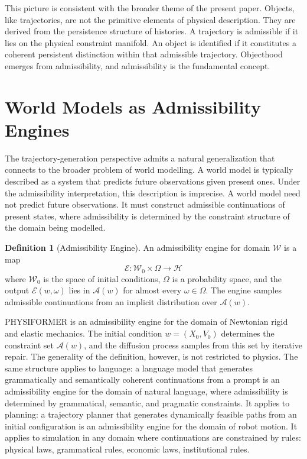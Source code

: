 \documentclass[12pt,oneside]{article}
\theoremstyle{definition}
\newtheorem{definition}[theorem]{Definition}
\newcommand{\A}{\mathcal{A}}
\newcommand{\H}{\mathcal{H}}
\newcommand{\W}{\mathcal{W}}
\begin{document}
This picture is consistent with the broader theme of the present paper. Objects,
like trajectories, are not the primitive elements of physical description. They
are derived from the persistence structure of histories. A trajectory is admissible
if it lies on the physical constraint manifold. An object is identified if it
constitutes a coherent persistent distinction within that admissible trajectory.
Objecthood emerges from admissibility, and admissibility is the fundamental
concept.

\section{World Models as Admissibility Engines}

The trajectory-generation perspective admits a natural generalization that
connects to the broader problem of world modelling. A world model is typically
described as a system that predicts future observations given present ones.
Under the admissibility interpretation, this description is imprecise. A world
model need not predict future observations. It must construct admissible
continuations of present states, where admissibility is determined by the
constraint structure of the domain being modelled.

\begin{definition}[Admissibility Engine]
An admissibility engine for domain \(\W\) is a map
\[
\mathcal{E} : \W_0 \times \Omega \to \H
\]
where \(\W_0\) is the space of initial conditions, \(\Omega\) is a probability
space, and the output \(\mathcal{E}(w, \omega)\) lies in \(\A(w)\) for almost
every \(\omega \in \Omega\). The engine samples admissible continuations from
an implicit distribution over \(\A(w)\).
\end{definition}

PHYSIFORMER is an admissibility engine for the domain of Newtonian rigid and
elastic mechanics. The initial condition \(w = (X_0, V_0)\) determines the
constraint set \(\A(w)\), and the diffusion process samples from this set by
iterative repair. The generality of the definition, however, is not restricted
to physics. The same structure applies to language: a language model that generates
grammatically and semantically coherent continuations from a prompt is an
admissibility engine for the domain of natural language, where admissibility
is determined by grammatical, semantic, and pragmatic constraints. It applies to
planning: a trajectory planner that generates dynamically feasible paths from an
initial configuration is an admissibility engine for the domain of robot motion.
It applies to simulation in any domain where continuations are constrained by
rules: physical laws, grammatical rules, economic laws, institutional rules.
\end{document}
